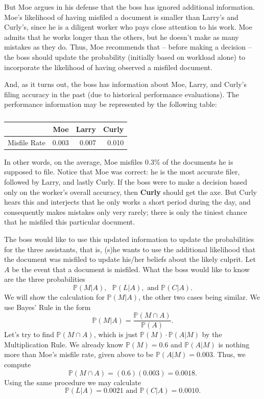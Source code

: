 \documentclass[captions=tableheading]{scrbook}
\begin{document}
\begin{example}
But Moe argues in his defense that the boss has ignored additional information. Moe's likelihood of having misfiled a document is smaller than Larry's and Curly's, since he is a diligent worker who pays close attention to his work. Moe admits that he works longer than the others, but he doesn't make as many mistakes as they do. Thus, Moe recommends that -- before making a decision -- the boss should update the probability (initially based on workload alone) to incorporate the likelihood of having observed a misfiled document.

And, as it turns out, the boss has information about Moe, Larry, and Curly's filing accuracy in the past (due to historical performance evaluations). The performance information may be represented by the following table:

\begin{table}[htb]
\caption[Misfiling assistants: misfile rate]{} 
\begin{center}
\begin{tabular}{lrrr}
               &    Moe  &  Larry  &  Curly  \\
\hline
 Misfile Rate  &  0.003  &  0.007  &  0.010  \\
\end{tabular}
\end{center}
\end{table}


In other words, on the average, Moe misfiles 0.3\% of the documents he is supposed to file. Notice that Moe was correct: he is the most accurate filer, followed by Larry, and lastly Curly. If the boss were to make a decision based only on the worker's overall accuracy, then \textbf{Curly} should get the axe. But Curly hears this and interjects that he only works a short period during the day, and consequently makes mistakes only very rarely; there is only the tiniest chance that he misfiled this particular document.

The boss would like to use this updated information to update the probabilities for the three assistants, that is, (s)he wants to use the additional likelihood that the document was misfiled to update his/her beliefs about the likely culprit. Let \(A\) be the event that a document is misfiled. What the boss would like to know are the three probabilities
\[
\mathbb{P}(M|A),\mbox{ }\mathbb{P}(L|A),\mbox{ and }\mathbb{P}(C|A).
\]
We will show the calculation for \(\mathbb{P}(M|A)\), the other two cases being similar. We use Bayes' Rule in the form
\[
\mathbb{P}(M|A)=\frac{\mathbb{P}(M\cap A)}{\mathbb{P}(A)}.
\]
Let's try to find \(\mathbb{P}(M\cap A)\), which is just \(\mathbb{P}(M)\cdot\mathbb{P}(A|M)\) by the Multiplication Rule. We already know \(\mathbb{P}(M)=0.6\) and \(\mathbb{P}(A|M)\) is nothing more than Moe's misfile rate, given above to be \(\mathbb{P}(A|M)=0.003\). Thus, we compute
\[
\mathbb{P}(M\cap A)=(0.6)(0.003)=0.0018.
\]
Using the same procedure we may calculate
\[
\mathbb{P}(L|A)=0.0021\mbox{ and }\mathbb{P}(C|A)=0.0010.
\]


\end{example}
\end{document}
